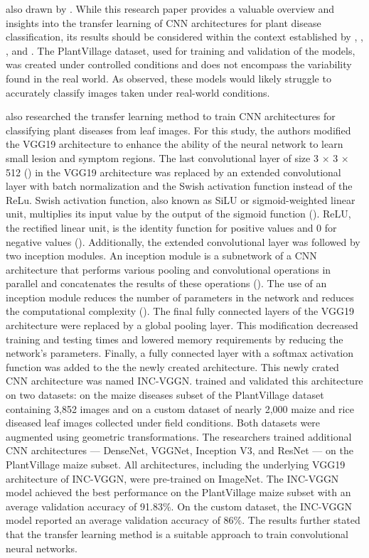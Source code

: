 \documentclass{BachelorBUI}
\begin{document}
also drawn by \textcite{Mohanty:2016}. While this research paper provides a valuable overview and insights into the transfer learning of CNN architectures for plant disease classification, its results should be considered within the context established by \cite{Mohanty:2016}, \cite{Barbedo:2018:1}, \cite{Barbedo:2018:2}, and \cite{Barbedo:2019}.  The PlantVillage dataset, used for training and validation of the models, was created under controlled conditions and does not encompass the variability found in the real world. As \textcite{Mohanty:2016} observed, these models would likely struggle to accurately classify images taken under real-world conditions.

\textcite{Chen:2020} also researched the transfer learning method to train CNN architectures for classifying plant diseases from leaf images. For this study, the authors modified the VGG19 architecture to enhance the ability of the neural network to learn small lesion and symptom regions. The last convolutional layer of size 3 $\times$ 3 $\times$ 512 (\cite{Simonyan:2015}) in the VGG19 architecture was replaced by an extended convolutional layer with batch normalization and the Swish activation function instead of the ReLu. Swish activation function, also known as SiLU or sigmoid-weighted linear unit, multiplies its input value by the output of the sigmoid function (\cite{Dubey:2022}). ReLU, the rectified linear unit, is the identity function for positive values and 0 for negative values (\cite{Dubey:2022}). Additionally, the extended convolutional layer was followed by two inception modules. An inception module is a subnetwork of a CNN architecture that performs various pooling and convolutional operations in parallel and concatenates the results of these operations (\cite{Szegedy:2015:1,Gu:2018}). The use of an inception module reduces the number of parameters in the network and reduces the computational complexity (\cite{Szegedy:2015:1,Gu:2018}). The final fully connected layers of the VGG19 architecture were replaced by a global pooling layer. This modification decreased training and testing times and lowered memory requirements by reducing the network's parameters. Finally, a fully connected layer with a softmax activation function was added to the the newly created architecture. This newly crated CNN architecture was named INC-VGGN. \textcite{Chen:2020} trained and validated this architecture on two datasets: on the maize diseases subset of the PlantVillage dataset containing 3,852 images and on a custom dataset of nearly 2,000 maize and rice diseased leaf images collected under field conditions. Both datasets were augmented using geometric transformations. The researchers trained additional CNN architectures --- DenseNet, VGGNet, Inception V3, and ResNet --- on the PlantVillage maize subset. All architectures, including the underlying VGG19 architecture of INC-VGGN, were pre-trained on ImageNet. The INC-VGGN model achieved the best performance on the PlantVillage maize subset with an average validation accuracy of 91.83\%. On the custom dataset, the INC-VGGN model reported an average validation accuracy of 86\%. The results further stated that the transfer learning method is a suitable approach to train convolutional neural networks.
\end{document}
